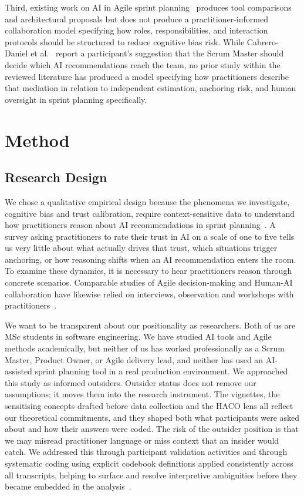 \documentclass[a4paper,twoside]{bth}
\begin{document}
Third, existing work on AI in Agile sprint planning~\cite{muneer2025leveraging, kula2024context, rahmahsari2026ai} produces tool comparisons and architectural proposals but does not produce a practitioner-informed collaboration model specifying how roles, responsibilities, and interaction protocols should be structured to reduce cognitive bias risk. While Cabrero-Daniel et al.~\cite{cabrero2024exploring} report a participant's suggestion that the Scrum Master should decide which AI recommendations reach the team, no prior study within the reviewed literature has produced a model specifying how practitioners describe that mediation in relation to independent estimation, anchoring risk, and human oversight in sprint planning specifically.

\chapter{Method}
\label{chp:method}

\section{Research Design}

We chose a qualitative empirical design because the phenomena we investigate, cognitive bias and trust calibration, require context-sensitive data to understand how practitioners reason about AI recommendations in sprint planning~\cite{creswell2013}. A survey asking practitioners to rate their trust in AI on a scale of one to five tells us very little about what actually drives that trust, which situations trigger anchoring, or how reasoning shifts when an AI recommendation enters the room. To examine these dynamics, it is necessary to hear practitioners reason through concrete scenarios. Comparable studies of Agile decision-making and Human-AI collaboration have likewise relied on interviews, observation and workshops with practitioners~\cite{drury2013investigation, hamza2024human}.

We want to be transparent about our positionality as researchers. Both of us are MSc students in software engineering. We have studied AI tools and Agile methods academically, but neither of us has worked professionally as a Scrum Master, Product Owner, or Agile delivery lead, and neither has used an AI-assisted sprint planning tool in a real production environment. We approached this study as informed outsiders. Outsider status does not remove our assumptions; it moves them into the research instrument. The vignettes, the sensitising concepts drafted before data collection and the HACO lens all reflect our theoretical commitments, and they shaped both what participants were asked about and how their answers were coded. The risk of the outsider position is that we may misread practitioner language or miss context that an insider would catch. We addressed this through participant validation activities and through systematic coding using explicit codebook definitions applied consistently across all transcripts, helping to surface and resolve interpretive ambiguities before they became embedded in the analysis~\cite{braun2006using, creswell2013}.
\end{document}
